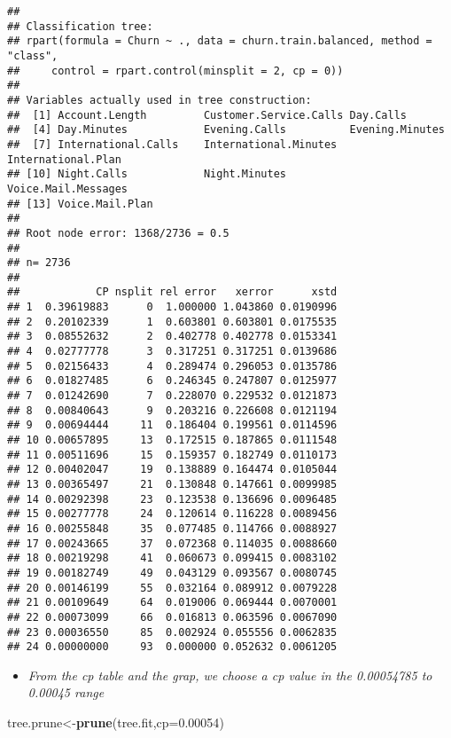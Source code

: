 \documentclass[]{article}
\newenvironment{Shaded}{\begin{snugshade}}{\end{snugshade}}
\newcommand{\DataTypeTok}[1]{\textcolor[rgb]{0.13,0.29,0.53}{#1}}
\newcommand{\FloatTok}[1]{\textcolor[rgb]{0.00,0.00,0.81}{#1}}
\newcommand{\KeywordTok}[1]{\textcolor[rgb]{0.13,0.29,0.53}{\textbf{#1}}}
\newcommand{\NormalTok}[1]{#1}
\providecommand{\tightlist}{%
  \setlength{\itemsep}{0pt}\setlength{\parskip}{0pt}}
\begin{document}
\begin{verbatim}
## 
## Classification tree:
## rpart(formula = Churn ~ ., data = churn.train.balanced, method = "class", 
##     control = rpart.control(minsplit = 2, cp = 0))
## 
## Variables actually used in tree construction:
##  [1] Account.Length         Customer.Service.Calls Day.Calls             
##  [4] Day.Minutes            Evening.Calls          Evening.Minutes       
##  [7] International.Calls    International.Minutes  International.Plan    
## [10] Night.Calls            Night.Minutes          Voice.Mail.Messages   
## [13] Voice.Mail.Plan       
## 
## Root node error: 1368/2736 = 0.5
## 
## n= 2736 
## 
##            CP nsplit rel error   xerror      xstd
## 1  0.39619883      0  1.000000 1.043860 0.0190996
## 2  0.20102339      1  0.603801 0.603801 0.0175535
## 3  0.08552632      2  0.402778 0.402778 0.0153341
## 4  0.02777778      3  0.317251 0.317251 0.0139686
## 5  0.02156433      4  0.289474 0.296053 0.0135786
## 6  0.01827485      6  0.246345 0.247807 0.0125977
## 7  0.01242690      7  0.228070 0.229532 0.0121873
## 8  0.00840643      9  0.203216 0.226608 0.0121194
## 9  0.00694444     11  0.186404 0.199561 0.0114596
## 10 0.00657895     13  0.172515 0.187865 0.0111548
## 11 0.00511696     15  0.159357 0.182749 0.0110173
## 12 0.00402047     19  0.138889 0.164474 0.0105044
## 13 0.00365497     21  0.130848 0.147661 0.0099985
## 14 0.00292398     23  0.123538 0.136696 0.0096485
## 15 0.00277778     24  0.120614 0.116228 0.0089456
## 16 0.00255848     35  0.077485 0.114766 0.0088927
## 17 0.00243665     37  0.072368 0.114035 0.0088660
## 18 0.00219298     41  0.060673 0.099415 0.0083102
## 19 0.00182749     49  0.043129 0.093567 0.0080745
## 20 0.00146199     55  0.032164 0.089912 0.0079228
## 21 0.00109649     64  0.019006 0.069444 0.0070001
## 22 0.00073099     66  0.016813 0.063596 0.0067090
## 23 0.00036550     85  0.002924 0.055556 0.0062835
## 24 0.00000000     93  0.000000 0.052632 0.0061205
\end{verbatim}

\begin{itemize}
\tightlist
\item
  \emph{From the cp table and the grap, we choose a cp value in the
  0.00054785 to 0.00045 range}
\end{itemize}

\begin{Shaded}
\begin{Highlighting}[]
\NormalTok{tree.prune<-}\KeywordTok{prune}\NormalTok{(tree.fit,}\DataTypeTok{cp=}\FloatTok{0.00054}\NormalTok{)}
\end{Highlighting}
\end{Shaded}
\end{document}

